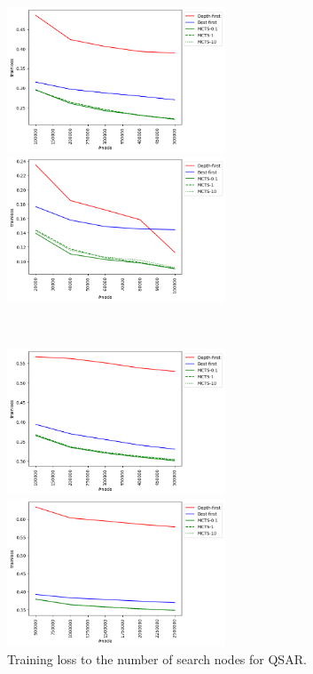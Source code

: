 \begin{figure}[htbp]
 \begin{minipage}{0.5\hsize}
  \begin{center}
   \includegraphics[width=65mm]{img/cpdb/grid/trainloss_node.png}
  \end{center}
 \end{minipage}
 \begin{minipage}{0.5\hsize}
  \begin{center}
   \includegraphics[width=65mm]{img/mutag/grid/trainloss_node.png}
  \end{center}
 \end{minipage}\\
 \begin{minipage}{0.5\hsize}
  \begin{center}
   \includegraphics[width=65mm]{img/aids/grid/trainloss_node.png}
  \end{center}
 \end{minipage}
 \begin{minipage}{0.5\hsize}
  \begin{center}
   \includegraphics[width=65mm]{img/cas/grid/trainloss_node.png}
  \end{center}
 \end{minipage}
 \caption{Training loss to the number of search nodes for QSAR.}
  \label{fig:trainloss}
\end{figure}

